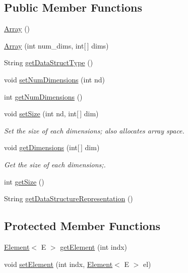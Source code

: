\subsection*{Public Member Functions}
\begin{DoxyCompactItemize}
\item 
\mbox{\hyperlink{classbridges_1_1base_1_1_array_ad5dbf7bbd9811c2dac16a5c135465d4b}{Array}} ()
\item 
\mbox{\hyperlink{classbridges_1_1base_1_1_array_ab37dbe6efe0c34242456971e430763f7}{Array}} (int num\+\_\+dims, int\mbox{[}$\,$\mbox{]} dims)
\item 
String \mbox{\hyperlink{classbridges_1_1base_1_1_array_ad138b9787d46d053d6bd324b344be9a6}{get\+Data\+Struct\+Type}} ()
\item 
void \mbox{\hyperlink{classbridges_1_1base_1_1_array_ab7859668a25d16adfdb308e24c7d44c6}{set\+Num\+Dimensions}} (int nd)
\item 
int \mbox{\hyperlink{classbridges_1_1base_1_1_array_a808da9a62df3f0e7a905ec895a82087a}{get\+Num\+Dimensions}} ()
\item 
void \mbox{\hyperlink{classbridges_1_1base_1_1_array_aa357b6b957eeedfdb5acc9d653d7260f}{set\+Size}} (int nd, int\mbox{[}$\,$\mbox{]} dim)
\begin{DoxyCompactList}\small\item\em Set the size of each dimensions; also allocates array space. \end{DoxyCompactList}\item 
void \mbox{\hyperlink{classbridges_1_1base_1_1_array_af7aa7f3f18989af5f48a2b69cb7fb07d}{get\+Dimensions}} (int\mbox{[}$\,$\mbox{]} dim)
\begin{DoxyCompactList}\small\item\em Get the size of each dimensions;. \end{DoxyCompactList}\item 
int \mbox{\hyperlink{classbridges_1_1base_1_1_array_a49a3a4ea72c8315f1f14eed25071d18a}{get\+Size}} ()
\item 
String \mbox{\hyperlink{classbridges_1_1base_1_1_array_a111592e8b75202064bdf06d9c2234d74}{get\+Data\+Structure\+Representation}} ()
\end{DoxyCompactItemize}
\subsection*{Protected Member Functions}
\begin{DoxyCompactItemize}
\item 
\mbox{\hyperlink{classbridges_1_1base_1_1_element}{Element}}$<$ E $>$ \mbox{\hyperlink{classbridges_1_1base_1_1_array_a0e690cbe2606e44cce99b56802b63e0e}{get\+Element}} (int indx)
\item 
void \mbox{\hyperlink{classbridges_1_1base_1_1_array_aafde1304d602e8b0f673dd61bc00c18f}{set\+Element}} (int indx, \mbox{\hyperlink{classbridges_1_1base_1_1_element}{Element}}$<$ E $>$ el)
\end{DoxyCompactItemize}
